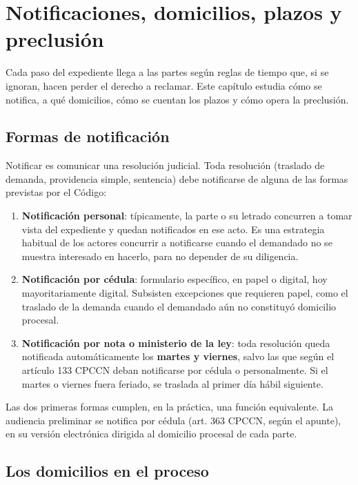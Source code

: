 \documentclass[12pt,oneside]{book}
\begin{document}
\chapter{Notificaciones, domicilios, plazos y preclusión}\label{cap:plazos}

Cada paso del expediente llega a las partes según reglas de tiempo que, si se ignoran, hacen perder el derecho a reclamar. Este capítulo estudia cómo se notifica, a qué domicilios, cómo se cuentan los plazos y cómo opera la preclusión.

\section{Formas de notificación}

Notificar es comunicar una resolución judicial. Toda resolución (traslado de demanda, providencia simple, sentencia) debe notificarse de alguna de las formas previstas por el Código:

\begin{enumerate}
\item \textbf{Notificación personal}: típicamente, la parte o su letrado concurren a tomar vista del expediente y quedan notificados en ese acto. Es una estrategia habitual de los actores concurrir a notificarse cuando el demandado no se muestra interesado en hacerlo, para no depender de su diligencia.
\item \textbf{Notificación por cédula}: formulario específico, en papel o digital, hoy mayoritariamente digital. Subsisten excepciones que requieren papel, como el traslado de la demanda cuando el demandado aún no constituyó domicilio procesal.
\item \textbf{Notificación por nota o ministerio de la ley}: toda resolución queda notificada automáticamente los \textbf{martes y viernes}, salvo las que según el artículo 133 CPCCN deban notificarse por cédula o personalmente. Si el martes o viernes fuera feriado, se traslada al primer día hábil siguiente.
\end{enumerate}

Las dos primeras formas cumplen, en la práctica, una función equivalente. La audiencia preliminar se notifica por cédula (art. 363 CPCCN, según el apunte), en su versión electrónica dirigida al domicilio procesal de cada parte.

\section{Los domicilios en el proceso}
\end{document}
